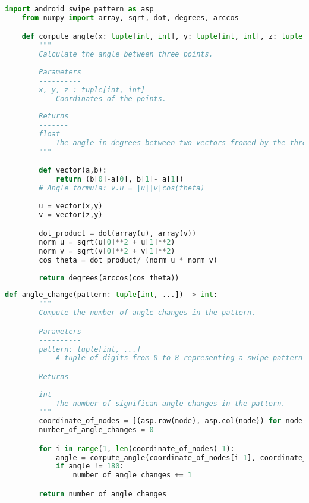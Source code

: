 \documentclass[12pt]{article}
\theoremstyle{definition}
\begin{document}
\begin{lstlisting}[language=Python, caption=Code snippet to compute angle between two vectors]
    import android_swipe_pattern as asp
    from numpy import array, sqrt, dot, degrees, arccos

    def compute_angle(x: tuple[int, int], y: tuple[int, int], z: tuple[int, int]) -> float:
        """ 
        Calculate the angle between three points. 
        
        Parameters 
        ---------- 
        x, y, z : tuple[int, int] 
            Coordinates of the points. 
        
        Returns 
        ------- 
        float 
            The angle in degrees between two vectors fromed by the three points. 
        """

        def vector(a,b):
            return (b[0]-a[0], b[1]- a[1])
        # Angle formula: v.u = |u||v|cos(theta)
        
        u = vector(x,y)
        v = vector(z,y)

        dot_product = dot(array(u), array(v))
        norm_u = sqrt(u[0]**2 + u[1]**2)
        norm_v = sqrt(v[0]**2 + v[1]**2)
        cos_theta = dot_product/ (norm_u * norm_v)
        
        return degrees(arccos(cos_theta))
\end{lstlisting}

\begin{lstlisting}[language=Python, caption=Code snippet the metric Change in angle]
    def angle_change(pattern: tuple[int, ...]) -> int:
        """
        Compute the number of angle changes in the pattern.

        Parameters
        ----------
        pattern: tuple[int, ...]
            A tuple of digits from 0 to 8 representing a swipe pattern.

        Returns
        -------
        int
            The number of significan angle changes in the pattern.
        """
        coordinate_of_nodes = [(asp.row(node), asp.col(node)) for node in pattern]
        number_of_angle_changes = 0

        for i in range(1, len(coordinate_of_nodes)-1):
            angle = compute_angle(coordinate_of_nodes[i-1], coordinate_of_nodes[i], coordinate_of_nodes[i+1])
            if angle != 180:
                number_of_angle_changes += 1

        return number_of_angle_changes
\end{lstlisting}
\end{document}
